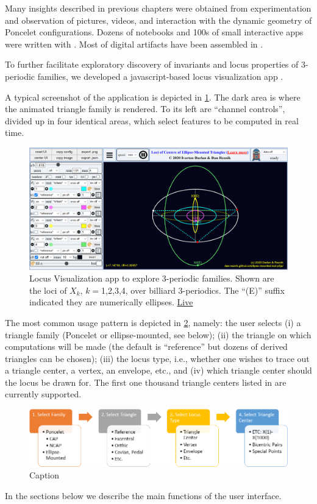 Many insights described in previous chapters were obtained from experimentation and observation of pictures, videos, and interaction with the dynamic geometry of Poncelet configurations. Dozens of notebooks and 100s of small interactive apps were written with \cite{mathematica_v10}. Most of digital artifacts have been assembled in 
\cite{reznik2021-observable-media}.

To further facilitate exploratory discovery of invariants and locus properties of 3-periodic families, we developed a javascript-based locus visualization app \cite{darlan2020-app}.

A typical screenshot of the application is depicted in \cref{fig:09-screenshot}. The dark area is where the animated triangle family is rendered. To its left are ``channel controls'', divided up in four identical areas, which select features to be computed in real time. 

\begin{figure}
    \centering
    \includegraphics[width=\textwidth]{chap_09/pics/pics_09_010_screenshot.png}
    \caption{Locus Visualization app to explore 3-periodic families. Shown are the loci of $X_k$, $k=$1,2,3,4, over billiard 3-periodics. The ``(E)'' suffix indicated they are numerically ellipses. \href{https://bit.ly/3yV8caF}{Live}}
    \label{fig:09-screenshot}
\end{figure}

The most common usage pattern is depicted in \cref{fig:09-flow}, namely: the user selects (i) a triangle family (Poncelet or ellipse-mounted, see below); (ii) the triangle on which computations will be made (the default is ``reference'' but dozens of derived triangles can be chosen); (iii) the locus type, i.e., whether one wishes to trace out a triangle center, a vertex, an envelope, etc., and (iv) which triangle center should the locus be drawn for. The first one thousand triangle centers listed in \cite{etc} are currently supported.

\begin{figure}
    \centering
    \includegraphics[width=\textwidth]{chap_09/pics/pics_09_020_workflow.png}
    \caption{Caption}
    \label{fig:09-flow}
\end{figure}

In the sections below we describe the main functions of the user interface.

